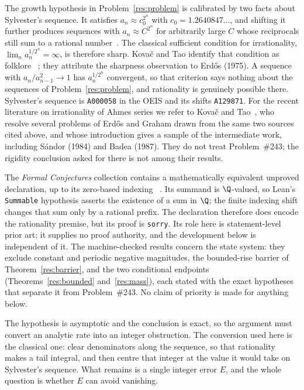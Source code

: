 \documentclass[11pt]{article}
\begin{document}
The growth hypothesis in Problem~\ref{res:problem} is calibrated by two facts
about Sylvester's sequence.  It satisfies $a_n\approx c_0^{2^{n}}$ with
$c_0=1.2640847\ldots$, and shifting it further produces sequences with
$a_n\approx C^{2^{n}}$ for arbitrarily large $C$ whose reciprocals still sum
to a rational number~\cite[arXiv v4, p.~2]{kovactao2024}.  The classical sufficient
condition for irrationality, $\lim_n a_n^{1/2^{n}}=\infty$, is therefore
sharp.  Kova\v{c} and Tao identify that condition as folklore
~\cite[arXiv v4, p.~2]{kovactao2024}; they attribute the sharpness observation to
Erd\H{o}s (1975).  A sequence with
$a_n/a_{n-1}^{2}\to1$ has $a_n^{1/2^{n}}$
convergent, so that criterion says nothing about the sequences of
Problem~\ref{res:problem}, and rationality is genuinely possible there.
Sylvester's
sequence is \texttt{A000058} in the OEIS and its shifts \texttt{A129871}.  For
the recent literature on irrationality of Ahmes series we refer to Kova\v{c}
and Tao~\cite{kovactao2024}, who resolve several problems of Erd\H{o}s and
Graham drawn from the same two sources cited above, and whose introduction
gives a sample of the intermediate work, including S\'andor (1984) and Badea
(1987).  They do not treat Problem~\#243; the rigidity conclusion asked for
there is not among their results.

The \emph{Formal Conjectures} collection contains a mathematically equivalent
unproved declaration, up to its zero-based indexing
~\cite{formalconjectures243}.  Its summand is $\Q$-valued, so Lean's
\texttt{Summable} hypothesis asserts the existence of a sum in $\Q$; the
finite indexing shift changes that sum only by a rational prefix.  The
declaration therefore does encode the rationality premise, but its proof is
\texttt{sorry}.  Its role here is statement-level prior art; it supplies no
proof authority, and the development below is independent of it.
The machine-checked results concern the state system: they exclude constant and
periodic negative magnitudes, the bounded-rise barrier of
Theorem~\ref{res:barrier}, and the two conditional endpoints
(Theorems~\ref{res:bounded} and~\ref{res:mass}), each stated with the exact
hypotheses that separate it from Problem~\#243.  No claim of priority is made
for anything below.

The hypothesis is asymptotic and the conclusion is exact, so the argument must
convert an analytic rate into an integer obstruction.  The conversion used here
is the classical one: clear denominators along the sequence, so that
rationality makes a tail integral, and then centre that integer at the value it
would take on Sylvester's sequence.  What remains is a single integer error
$E$, and the whole question is whether $E$ can avoid vanishing.
\end{document}

